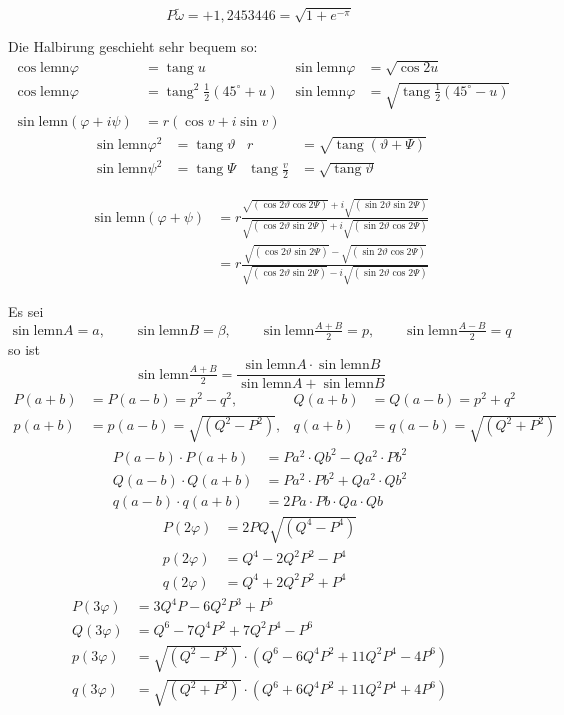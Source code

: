 \documentclass[10pt,a4paper]{article}
\newcommand{\lemn}{\text{lemn}}
\newcommand{\sinlemn}{\sin\lemn}
\newcommand{\coslemn}{\cos\lemn}
\DeclareMathOperator{\tg}{tang}
\begin{document}
\[
P\tilde{\omega} = +1{,}2453446 = \sqrt{1+e^{-\pi}}
\]

Die Halbirung geschieht sehr bequem so:
\begin{align*}
\coslemn\varphi &= \tg u & \sinlemn\varphi &= \sqrt{\cos 2u}\\
\coslemn\varphi &= \tg^2\tfrac12(45^\circ+u) & \sinlemn\varphi &= \sqrt{\tg\tfrac12(45^\circ-u)}\\
\sinlemn(\varphi+i\psi) &= r(\cos v+i\sin v)
\end{align*}
\begin{align*}
\sinlemn\varphi^2 &= \tg\vartheta & r &= \sqrt{\tg(\vartheta+\Psi)}\\
\sinlemn\psi^2 &= \tg\Psi & \tg\tfrac{v}{2} &= \sqrt{\tg\vartheta}
\end{align*}

\begin{align*}
\sinlemn(\varphi+\psi) &= r\frac{\sqrt{(\cos 2\vartheta\cos 2\Psi)} + i\sqrt{(\sin 2\vartheta\sin 2\Psi)}}{\sqrt{(\cos 2\vartheta\sin 2\Psi)} + i\sqrt{(\sin 2\vartheta\cos 2\Psi)}}\\
&= r\frac{\sqrt{(\cos 2\vartheta\sin 2\Psi)} - \sqrt{(\sin 2\vartheta\cos 2\Psi)}}{\sqrt{(\cos 2\vartheta\sin 2\Psi)} - i\sqrt{(\sin 2\vartheta\cos 2\Psi)}}
\end{align*}

Es sei
\[
\sinlemn A = a, \qquad \sinlemn B = \beta, \qquad \sinlemn\tfrac{A+B}{2} = p, \qquad \sinlemn\tfrac{A-B}{2} = q
\]
so ist
\[
\sinlemn\tfrac{A+B}{2} = \frac{\sinlemn A \cdot \sinlemn B}{\sinlemn A + \sinlemn B}
\]
\begin{align*}
P(a+b) &= P(a-b) = p^2-q^2, & Q(a+b) &= Q(a-b) = p^2+q^2\\
p(a+b) &= p(a-b) = \sqrt{(Q^2-P^2)}, & q(a+b) &= q(a-b) = \sqrt{(Q^2+P^2)}
\end{align*}
\begin{align*}
P(a-b)\cdot P(a+b) &= Pa^2\cdot Qb^2 - Qa^2\cdot Pb^2\\
Q(a-b)\cdot Q(a+b) &= Pa^2\cdot Pb^2 + Qa^2\cdot Qb^2\\
q(a-b)\cdot q(a+b) &= 2Pa\cdot Pb\cdot Qa\cdot Qb
\end{align*}
\begin{align*}
P(2\varphi) &= 2PQ\sqrt{(Q^4-P^4)}\\
p(2\varphi) &= Q^4 - 2Q^2P^2 - P^4\\
q(2\varphi) &= Q^4 + 2Q^2P^2 + P^4
\end{align*}
\begin{align*}
P(3\varphi) &= 3Q^4P - 6Q^2P^3 + P^5\\
Q(3\varphi) &= Q^6 - 7Q^4P^2 + 7Q^2P^4 - P^6\\
p(3\varphi) &= \sqrt{(Q^2-P^2)}\cdot(Q^6-6Q^4P^2+11Q^2P^4-4P^6)\\
q(3\varphi) &= \sqrt{(Q^2+P^2)}\cdot(Q^6+6Q^4P^2+11Q^2P^4+4P^6)
\end{align*}
\end{document}
